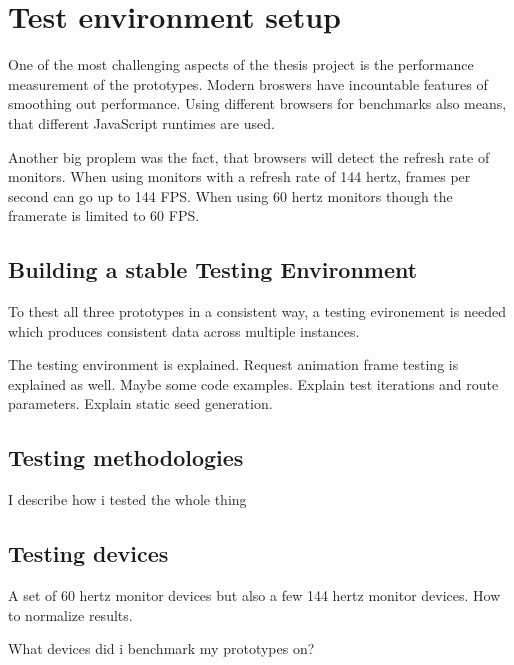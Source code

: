 \section{Test environment setup}

One of the most challenging aspects of the thesis project is the performance measurement of the prototypes. Modern broswers have incountable features of smoothing out performance. Using different browsers for benchmarks also means, that different JavaScript runtimes are used.

Another big proplem was the fact, that browsers will detect the refresh rate of monitors. When using monitors with a refresh rate of 144 hertz, frames per second can go up to 144 FPS. When using 60 hertz monitors though the framerate is limited to 60 FPS.

\subsection{Building a stable Testing Environment}

To thest all three prototypes in a consistent way, a testing evironement is needed which produces consistent data across multiple instances.

The testing environment is explained. Request animation frame testing is explained as well. Maybe some code examples. Explain test iterations and route parameters. Explain static seed generation.

\subsection{Testing methodologies}

I describe how i tested the whole thing

\subsection{Testing devices}

A set of 60 hertz monitor devices but also a few 144 hertz monitor devices. How to normalize results.

What devices did i benchmark my prototypes on?

